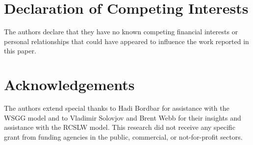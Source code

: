 \documentclass[preprint,12pt]{elsarticle}
\begin{document}

\section{Declaration of Competing Interests} \label{s:coi}

The authors declare that they have no known competing financial interests or personal relationships that could have appeared to influence the work reported in this paper.



\section*{Acknowledgements} \label{sec:acknowledgements}

The authors extend special thanks to Hadi Bordbar for assistance with the WSGG model and to Vladimir Solovjov and Brent Webb for their insights and assistance with the RCSLW model. 
This research did not receive any specific grant from funding agencies in the public, commercial, or
not-for-profit sectors.


 
 

\end{document}
